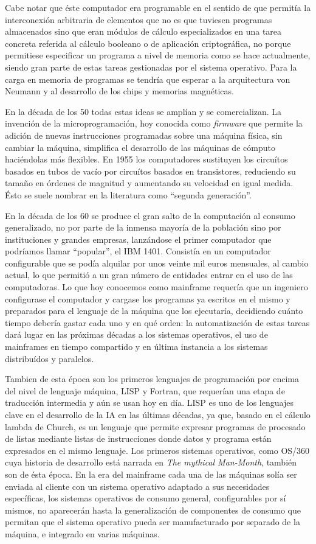 \documentclass[12pt]{memoir}
\begin{document}
\begin{appendices}
Cabe notar que éste computador era programable en el sentido de que permitía la interconexión arbitraria de elementos que no es que tuviesen programas almacenados sino que eran módulos de cálculo especializados en una tarea concreta referida al cálculo booleano o de aplicación criptográfica, no porque permitiese especificar un programa a nivel de memoria como se hace actualmente, siendo gran parte de estas tareas gestionadas por el sistema operativo. Para la carga en memoria de programas se tendría que esperar a la arquitectura von Neumann y al desarrollo de los chips y memorias magnéticas.

En la década de los 50 todas estas ideas se amplían y se comercializan. La invención de la microprogramación, hoy conocida como \textit{firmware} que permite la adición de nuevas instrucciones programadas sobre una máquina física, sin cambiar la máquina, simplifica el desarrollo de las máquinas de cómputo haciéndolas más flexibles. En 1955 los computadores sustituyen los circuítos basados en tubos de vacío por circuítos basados en transistores, reduciendo su tamaño en órdenes de magnitud y aumentando su velocidad en igual medida. Ésto se suele nombrar en la literatura como ``segunda generación''.

En la década de los 60 se produce el gran salto de la computación al consumo generalizado, no por parte de la inmensa mayoría de la población sino por instituciones y grandes empresas, lanzándose el primer computador que podríamos llamar ``popular'', el IBM 1401. Consistía en un computador configurable que se podía alquilar por unos veinte mil euros mensuales, al cambio actual, lo que permitió a un gran número de entidades entrar en el uso de las computadoras. Lo que hoy conocemos como mainframe requería que un ingeniero configurase el computador y cargase los programas ya escritos en el mismo y preparados para el lenguaje de la máquina que los ejecutaría, decidiendo cuánto tiempo debería gastar cada uno y en qué orden: la automatización de estas tareas dará lugar en las próximas décadas a los sistemas operativos, el uso de mainframes en tiempo compartido y en última instancia a los sistemas distribuídos y paralelos. 

Tambien de esta época son los primeros lenguajes de programación por encima del nivel de lenguaje máquina, LISP y Fortran, que requerían una etapa de traducción intermedia y aún se usan hoy en día. LISP es uno de los lenguajes clave en el desarrollo de la IA en las últimas décadas, ya que, basado en el cálculo lambda de Church, es un lenguaje que permite expresar programas de procesado de listas mediante listas de instrucciones donde datos y programa están expresados en el mismo lenguaje. Los primeros sistemas operativos, como OS/360 cuya historia de desarrollo está narrada en \textit{The mythical Man-Month}, también son de ésta época. En la era del mainframe cada una de las máquinas solía ser enviada al cliente con un sistema operativo adaptado a sus necesidades específicas, los sistemas operativos de consumo general, configurables por sí mismos, no aparecerán hasta la generalización de componentes de consumo que permitan que el sistema operativo pueda ser manufacturado por separado de la máquina, e integrado en varias máquinas.


\end{appendices}
\end{document}

